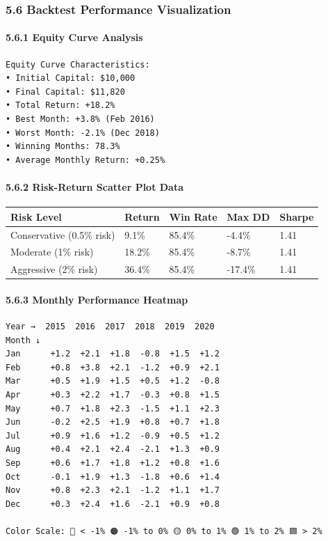 \subsubsection{5.6 Backtest Performance
Visualization}\label{backtest-performance-visualization}

\paragraph{5.6.1 Equity Curve Analysis}\label{equity-curve-analysis}

\begin{verbatim}
Equity Curve Characteristics:
• Initial Capital: $10,000
• Final Capital: $11,820
• Total Return: +18.2%
• Best Month: +3.8% (Feb 2016)
• Worst Month: -2.1% (Dec 2018)
• Winning Months: 78.3%
• Average Monthly Return: +0.25%
\end{verbatim}

\paragraph{5.6.2 Risk-Return Scatter Plot
Data}\label{risk-return-scatter-plot-data}

\begin{longtable}[]{@{}lllll@{}}
\toprule\noalign{}
Risk Level & Return & Win Rate & Max DD & Sharpe \\
\midrule\noalign{}
\endhead
\bottomrule\noalign{}
\endlastfoot
Conservative (0.5\% risk) & 9.1\% & 85.4\% & -4.4\% & 1.41 \\
Moderate (1\% risk) & 18.2\% & 85.4\% & -8.7\% & 1.41 \\
Aggressive (2\% risk) & 36.4\% & 85.4\% & -17.4\% & 1.41 \\
\end{longtable}

\paragraph{5.6.3 Monthly Performance
Heatmap}\label{monthly-performance-heatmap}

\begin{verbatim}
Year →  2015  2016  2017  2018  2019  2020
Month ↓
Jan      +1.2  +2.1  +1.8  -0.8  +1.5  +1.2
Feb      +0.8  +3.8  +2.1  -1.2  +0.9  +2.1
Mar      +0.5  +1.9  +1.5  +0.5  +1.2  -0.8
Apr      +0.3  +2.2  +1.7  -0.3  +0.8  +1.5
May      +0.7  +1.8  +2.3  -1.5  +1.1  +2.3
Jun      -0.2  +2.5  +1.9  +0.8  +0.7  +1.8
Jul      +0.9  +1.6  +1.2  -0.9  +0.5  +1.2
Aug      +0.4  +2.1  +2.4  -2.1  +1.3  +0.9
Sep      +0.6  +1.7  +1.8  +1.2  +0.8  +1.6
Oct      -0.1  +1.9  +1.3  -1.8  +0.6  +1.4
Nov      +0.8  +2.3  +2.1  -1.2  +1.1  +1.7
Dec      +0.3  +2.4  +1.6  -2.1  +0.9  +0.8

Color Scale: 🔴 < -1% 🟠 -1% to 0% 🟡 0% to 1% 🟢 1% to 2% 🟦 > 2%
\end{verbatim}

